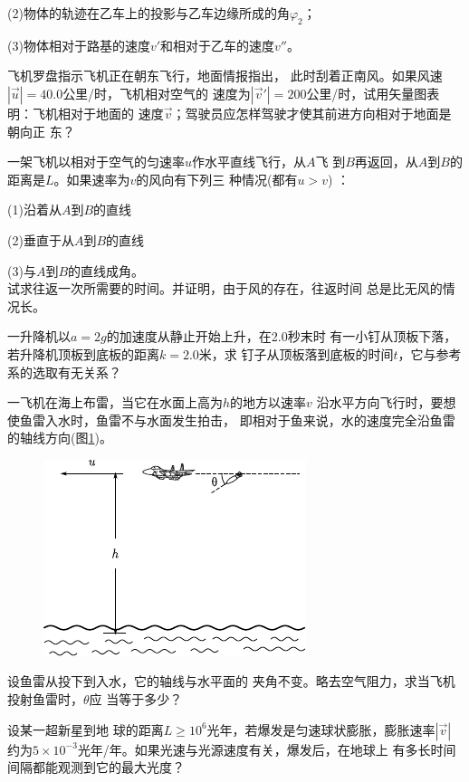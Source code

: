 \begin{exercises}
(2)物体的轨迹在乙车上的投影与乙车边缘所成的角$ \varphi _2 $；

(3)物体相对于路基的速度$ v' $和相对于乙车的速度$ v'' $。

\exercise 飞机罗盘指示飞机正在朝东飞行，地面情报指出，
此时刮着正南风。如果风速$ | \vec{u} | = 4 0 . 0  $公里/时，飞机相对空气的
速度为$ | \vec{v} ' | = 2 0 0  $公里/时，试用矢量图表明：飞机相对于地面的
速度$\vec{v}$；驾驶员应怎样驾驶才使其前进方向相对于地面是朝向正
东？

\exercise 一架飞机以相对于空气的匀速率$u$作水平直线飞行，从$A$飞
到$B$再返回，从$A$到$B$的距离是$L$。如果速率为$v$的风向有下列三
种情况(都有$ u > v$)  ：

(1)沿着从$A$到$B$的直线

(2)垂直于从$A$到$B$的直线

(3)与$A$到$B$的直线成角。\\
试求往返一次所需要的时间。并证明，由于风的存在，往返时间
总是比无风的情况长。

\exercise 一升降机以$ a = 2 g  $的加速度从静止开始上升，在2.0秒末时
有一小钉从顶板下落，若升降机顶板到底板的距离$ k = 2 . 0  $米，求
钉子从顶板落到底板的时间$t$，它与参考系的选取有无关系？

\exercise 一飞机在海上布雷，当它在水面上高为$h$的地方以速率$v$
沿水平方向飞行时，要想使鱼雷入水时，鱼雷不与水面发生拍击，
即相对于鱼来说，水的速度完全沿鱼雷的轴线方向(图\ref{fig:02.18})。
\begin{figure}
    \includegraphics{figure/fig02.18}
    \caption{}
    \label{fig:02.18}
\end{figure}
设鱼雷从投下到入水，它的轴线与水平面的
夹角不变。略去空气阻力，求当飞机投射鱼雷时，$\theta$应
当等于多少？

\exercise 设某一超新星到地
球的距离$ L \geqslant 1 0 ^ { 6 }  $光年，若爆发是匀速球状膨胀，膨胀速率$|\vec{v}|$约为$5 \times 1 0 ^ { - 3 }  $光年/年。如果光速与光源速度有关，爆发后，在地球上
有多长时间间隔都能观测到它的最大光度？


\end{exercises}
